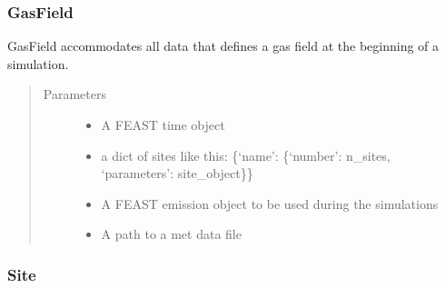 \documentclass[letterpaper,10pt,english]{sphinxmanual}
\begin{document}
\subsubsection{GasField}
\label{\detokenize{index:gasfield}}

\begin{fulllineitems}
\label{\detokenize{index:feast.EmissionSimModules.infrastructure_classes.GasField}}
GasField accommodates all data that defines a gas field at the beginning of a simulation.
\begin{quote}\begin{description}
\item[{Parameters}] \leavevmode\begin{itemize}
\item {} 
 \textendash{} A FEAST time object

\item {} 
 \textendash{} a dict of sites like this: \{‘name’: \{‘number’: n\_sites, ‘parameters’: site\_object\}\}

\item {} 
 \textendash{} A FEAST emission object to be used during the simulations

\item {} 
 \textendash{} A path to a met data file

\end{itemize}

\end{description}\end{quote}

\end{fulllineitems}



\subsubsection{Site}
\label{\detokenize{index:site}}
\end{document}

